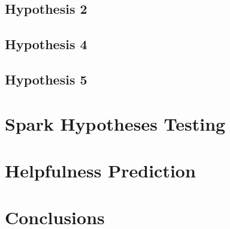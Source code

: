 \documentclass{class}
\begin{document}
\begin{multicols}{2}
    \subsection*{Hypothesis 2}
    
    \subsection*{Hypothesis 4}
    \subsection*{Hypothesis 5}
    
    \section{Spark Hypotheses Testing}
    \section{Helpfulness Prediction}
    \section{Conclusions}

\end{multicols}


\end{document}
